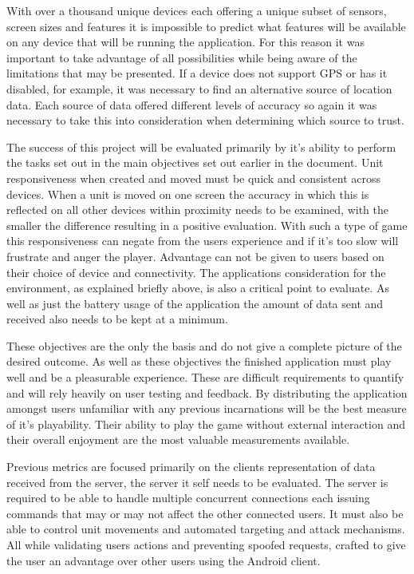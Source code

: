 With over a thousand unique devices each offering a unique subset of sensors, screen sizes and features it is impossible to predict what features will be available on any device that will be running the application. For this reason it was important to take advantage of all possibilities while being aware of the limitations that may be presented. If a device does not support GPS or has it disabled, for example, it was necessary to find an alternative source of location data. Each source of data offered different levels of accuracy so again it was necessary to take this into consideration when determining which source to trust.

The success of this project will be evaluated primarily by it's ability to perform the tasks set out in the main objectives set out earlier in the document. Unit responsiveness when created and moved must be quick and consistent across devices. When a unit is moved on one screen the accuracy in which this is reflected on all other devices within proximity needs to be examined, with the smaller the difference resulting in a positive evaluation. With such a type of game this responsiveness can negate from the users experience and if it's too slow will frustrate and anger the player. Advantage can not be given to users based on their choice of device and connectivity. The applications consideration for the environment, as explained briefly above, is also a critical point to evaluate. As well as just the battery usage of the application the amount of data sent and received also needs to be kept at a minimum.

These objectives are the only the basis and do not give a complete picture of the desired outcome. As well as these objectives the finished application must play well and be a pleasurable experience. These are difficult requirements to quantify and will rely heavily on user testing and feedback. By distributing the application amongst users unfamiliar with any previous incarnations will be the best measure of it's playability. Their ability to play the game without external interaction and their overall enjoyment are the most valuable measurements available.

Previous metrics are focused primarily on the clients representation of data received from the server, the server it self needs to be evaluated. The server is required to be able to handle multiple concurrent connections each issuing commands that may or may not affect the other connected users. It must also be able to control unit movements and automated targeting and attack mechanisms. All while validating users actions and preventing spoofed requests, crafted to give the user an advantage over other users using the Android client.
